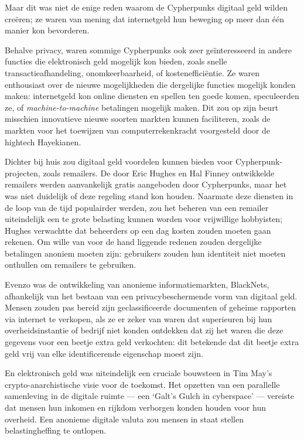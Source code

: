 \documentclass[smalldemyvopaper,11pt,twoside,onecolumn,openright,extrafontsizes,hidelinks]{memoir}
\begin{document}
Maar dit was niet de enige reden waarom de Cypherpunks digitaal geld
wilden creëren; ze waren van mening dat internetgeld hun beweging op
meer dan één manier kon bevorderen.

Behalve privacy, waren sommige Cypherpunks ook zeer geïnteresseerd in
andere functies die elektronisch geld mogelijk kon bieden, zoals snelle
transactieafhandeling, onomkeerbaarheid, of kostenefficiëntie. Ze waren
enthousiast over de nieuwe mogelijkheden die dergelijke functies
mogelijk konden maken: internetgeld kon online diensten en spellen ten
goede komen, speculeerden ze, of \emph{machine-to-machine} betalingen
mogelijk maken. Dit zou op zijn beurt misschien innovatieve nieuwe
soorten markten kunnen faciliteren, zoals de markten voor het toewijzen
van computerrekenkracht voorgesteld door de hightech Hayekianen.

Dichter bij huis zou digitaal geld voordelen kunnen bieden voor
Cypherpunk-projecten, zoals remailers. De door Eric Hughes en Hal Finney
ontwikkelde remailers werden aanvankelijk gratis aangeboden door
Cypherpunks, maar het was niet duidelijk of deze regeling stand kon
houden. Naarmate deze diensten in de loop van de tijd populairder
werden, zou het beheren van een remailer uiteindelijk een te grote
belasting kunnen worden voor vrijwillige hobbyisten; Hughes verwachtte
dat beheerders op een dag kosten zouden moeten gaan rekenen. Om wille
van voor de hand liggende redenen zouden dergelijke betalingen anoniem
moeten zijn: gebruikers zouden hun identiteit niet moeten onthullen om
remailers te gebruiken.

Evenzo was de ontwikkeling van anonieme informatiemarkten, BlackNets,
afhankelijk van het bestaan van een privacybeschermende vorm van
digitaal geld. Mensen zouden pas bereid zijn geclassificeerde documenten
of geheime rapporten via internet te verkopen, als ze er zeker van waren
dat superieuren bij hun overheidsinstantie of bedrijf niet konden
ontdekken dat zij het waren die deze gegevens voor een beetje extra geld
verkochten: dit betekende dat dit beetje extra geld vrij van elke
identificerende eigenschap moest zijn.

En elektronisch geld was uiteindelijk een cruciale bouwsteen in Tim
May's crypto-anarchistische visie voor de toekomst. Het opzetten van een
parallelle samenleving in de digitale ruimte --- een `Galt's Gulch in
cyberspace' --- vereiste dat mensen hun inkomen en rijkdom verborgen
konden houden voor hun overheid. Een anonieme digitale valuta zou mensen
in staat stellen belastingheffing te ontlopen.
\end{document}
